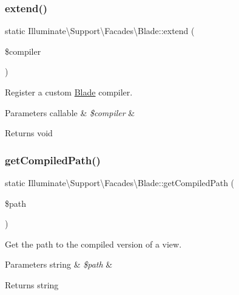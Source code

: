 \subsubsection{\texorpdfstring{extend()}{extend()}}
{\footnotesize\ttfamily static Illuminate\textbackslash{}\+Support\textbackslash{}\+Facades\textbackslash{}\+Blade\+::extend (\begin{DoxyParamCaption}\item[{}]{\$compiler }\end{DoxyParamCaption})\hspace{0.3cm}{\ttfamily [static]}}

Register a custom \mbox{\hyperlink{class_illuminate_1_1_support_1_1_facades_1_1_blade}{Blade}} compiler.


\begin{DoxyParams}[1]{Parameters}
callable & {\em \$compiler} & \\
\hline
\end{DoxyParams}
\begin{DoxyReturn}{Returns}
void 
\end{DoxyReturn}
\mbox{\label{class_illuminate_1_1_support_1_1_facades_1_1_blade_a9b2f060067fc407f0c0bd893a141d74f}} 
\subsubsection{\texorpdfstring{get\+Compiled\+Path()}{getCompiledPath()}}
{\footnotesize\ttfamily static Illuminate\textbackslash{}\+Support\textbackslash{}\+Facades\textbackslash{}\+Blade\+::get\+Compiled\+Path (\begin{DoxyParamCaption}\item[{}]{\$path }\end{DoxyParamCaption})\hspace{0.3cm}{\ttfamily [static]}}

Get the path to the compiled version of a view.


\begin{DoxyParams}[1]{Parameters}
string & {\em \$path} & \\
\hline
\end{DoxyParams}
\begin{DoxyReturn}{Returns}
string 
\end{DoxyReturn}
\mbox{\label{class_illuminate_1_1_support_1_1_facades_1_1_blade_ae7d3ff8509253bb984d96981a2d89226}} 
